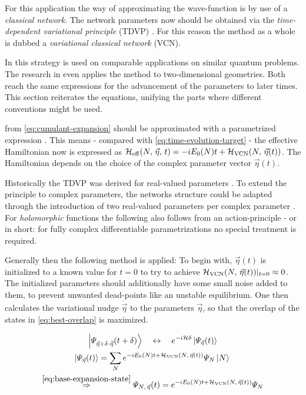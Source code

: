 For this application the way of approximating the wave-function is by use of a \emph{classical network}. 
The network parameters now should be obtained via the \emph{time-dependent variational principle} (TDVP) \cite{originalDerivationTimeDependendVariationalPrinciple}.
For this reason the method as a whole is dubbed a \emph{variational classical network} (VCN).

In \cite{variationalClassicalNetworksPaper} this strategy is used on comparable applications on similar quantum problems.
The research in \cite{probabilitySamplingRequirementVCN} even applies the method to two-dimensional geometries.
Both reach the same expressions for the advancement of the parameters to later times.
This section reiterates the equations, unifying the parts where different conventions might be used.

\HNOft from \autoref{eq:cumulant-expansion} should be approximated with a parametrized expression .
This means - compared with \autoref{eq:time-evolution-target} - the effective Hamiltonian now is expressed as $\HeffOft[N,\,\vec{\eta}] = -i E_0(N) t + \Hvcn{\vec{\eta}(t)}$.
The Hamiltonian depends on the choice of the complex parameter vector $\vec{\eta}(t)$.

Historically the TDVP was derived for real-valued parameters \cite{originalDerivationTimeDependendVariationalPrinciple}.
To extend the principle to complex parameters, the networks structure could be adapted through the introduction of two real-valued parameters per complex parameter \cite{TDVPcomplexPrefactors}.
For \emph{holomorphic} functions the following also follows from an action-principle \cite{probabilitySamplingRequirementVCN} - or in short: for fully complex differentiable \cite{complexDifferentiation} parametrizations no special treatment is required.

Generally then the following method is applied: To begin with, $\vec{\eta}(t)$ is initialized to a known value for $t=0$ to try to achieve $\Hvcn{\vec{\eta}(t)} \vert_{t=0} \approx 0$.
The initialized parameters should additionally have some small noise added to them, to prevent unwanted dead-points like an unstable equilibrium.
One then calculates the variational nudge $\dot{\vec{\eta}}$ to the parameters $\vec{\eta}$, so that the overlap of the states in \autoref{eq:best-overlap} is maximized.

\begin{equation}
    \label{eq:best-overlap}
    \begin{gathered}
        \ketpsiEta{\vec{\eta} + \delta \cdot \dot{\vec{\eta}}}{t + \delta} \quad\leftrightarrow\quad e^{-i \hamiltonian \delta} \ketpsiEta{\vec{\eta}}{t}
        \\
        \ketpsiEta{\vec{\eta}}{t} = \lsum[N] e^{-i E_0(N) t + \Hvcn{\vec{\eta}(t)}} \psiN \ketN{}
        \\
        \stackrel{\ref{eq:base-expansion-state}}{\Rightarrow} \psiEta{N,\,\vec{\eta}}{t} = e^{-i E_0(N) t + \Hvcn{\vec{\eta}(t)}} \psiN
    \end{gathered}
\end{equation}

